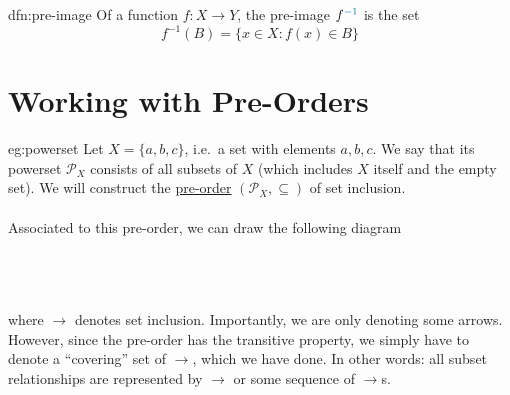 \begin{dfn}{dfn:pre-image}
    Of a function \( f : X \to Y \), the \textcolor{dfn-color}{pre-image} \( f^{\textcolor{dfn-color}{-1}} \) is the set
    \[
        f^{-1} (B) = \{ x \in X : f(x) \in B \}
    \]
\end{dfn}
\newpage
\section{Working with Pre-Orders}\label{sec:working-with-pre-orders}

\begin{eg}{eg:powerset}
    Let \( X = \{ a, b, c \} \), i.e.\ a set with elements \( a, b, c \).
    We say that its powerset \( \mathcal{P}_{X} \) consists of all subsets of \( X \) (which includes \( X \) itself and the empty set).
    We will construct the \hyperref[dfn:pre-order]{pre-order} \( (\mathcal{P}_{X}, \subseteq) \) of set inclusion.
    \\ \\
    Associated to this pre-order, we can draw the following diagram
    \\ \\
    \\ \\
    where \( \longrightarrow \) denotes set inclusion.
    Importantly, we are only denoting some arrows.
    However, since the pre-order has the transitive property, we simply have to denote a ``covering'' set of \( \longrightarrow \), which we have done.
    In other words: all subset relationships are represented by \( \longrightarrow \) or some sequence of \( \longrightarrow \)s.
\end{eg}

